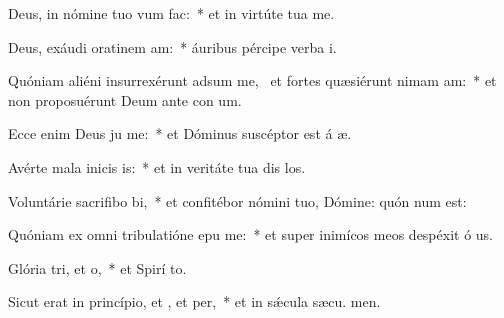 \item Deus, in nómine tuo vum  fac:~* et in virtúte tua  me.
\item Deus, exáudi oratinem am:~* áuribus pércipe verba  i.
\item Quóniam aliéni insurrexérunt adsum me,~\pscross{} et fortes quæsiérunt nimam am:~* et non proposuérunt Deum ante con um.
\item Ecce enim Deus ju me:~* et Dóminus suscéptor est á æ.
\item Avérte mala inicis is:~* et in veritáte tua dis los.
\item Voluntárie sacrifibo bi,~* et confitébor nómini tuo, Dómine: quón num est:
\item Quóniam ex omni tribulatióne epu me:~* et super inimícos meos despéxit ó us.
\item Glória tri, et o,~* et Spirí to.
\item Sicut erat in princípio, et , et per,~* et in sǽcula sæcu. men.
